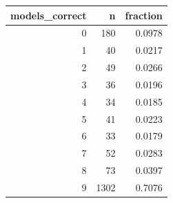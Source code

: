 \begin{tabular}{rrr}
\toprule
models\_correct & n & fraction \\
\midrule
0 & 180 & 0.0978 \\
1 & 40 & 0.0217 \\
2 & 49 & 0.0266 \\
3 & 36 & 0.0196 \\
4 & 34 & 0.0185 \\
5 & 41 & 0.0223 \\
6 & 33 & 0.0179 \\
7 & 52 & 0.0283 \\
8 & 73 & 0.0397 \\
9 & 1302 & 0.7076 \\
\bottomrule
\end{tabular}
